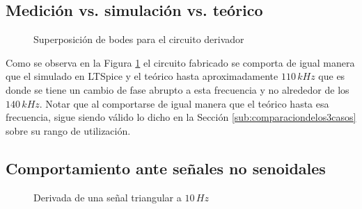 \documentclass[11pt, a4paper]{article}
\begin{document}
\subsection{Medición vs. simulación vs. teórico}
\begin{figure}[H]
	\begin{center}
		\caption{Superposición de bodes para el circuito derivador}
		\label{fig:superposiciontrescasos}
	\end{center}
\end{figure}

Como se observa en la Figura \ref{fig:superposiciontrescasos} el circuito fabricado se comporta de igual manera que el simulado en LTSpice y el teórico hasta aproximadamente $110 \, kHz$ que es donde se tiene un cambio de fase abrupto a esta frecuencia y no alrededor de los $140 \, kHz$. Notar que al comportarse de igual manera que el teórico hasta esa frecuencia, sigue siendo válido lo dicho en la Sección \ref{sub:comparaciondelos3casos} sobre su rango de utilización.

\subsection{Comportamiento ante señales no senoidales}

\begin{figure}[H]
	\begin{center}
		\caption{Derivada de una señal triangular a $10 \, Hz$}
		\label{fig:derivtriangNOcomp10Hz}
	\end{center}
\end{figure}
\end{document}
